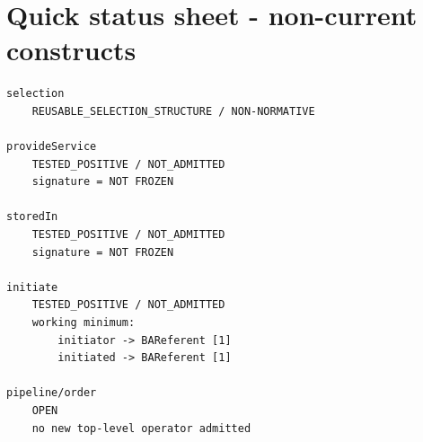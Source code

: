 \documentclass[11pt,a4paper]{article}
\begin{document}
\section{Quick status sheet - non-current constructs}
\begin{lstlisting}
selection
    REUSABLE_SELECTION_STRUCTURE / NON-NORMATIVE

provideService
    TESTED_POSITIVE / NOT_ADMITTED
    signature = NOT FROZEN

storedIn
    TESTED_POSITIVE / NOT_ADMITTED
    signature = NOT FROZEN

initiate
    TESTED_POSITIVE / NOT_ADMITTED
    working minimum:
        initiator -> BAReferent [1]
        initiated -> BAReferent [1]

pipeline/order
    OPEN
    no new top-level operator admitted
\end{lstlisting}
\end{document}
